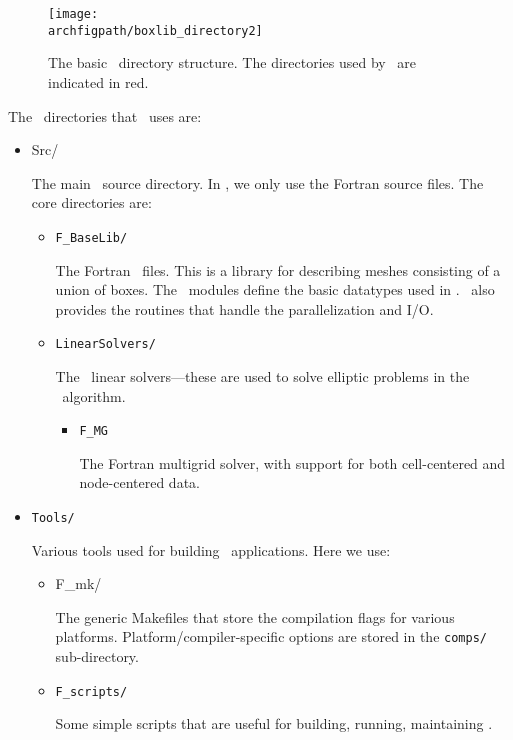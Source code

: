 \begin{figure}[t]
\centering
\texttt{[image: \\archfigpath/boxlib\_directory2]}
\caption[\boxlib\ directory structure]
{The basic \boxlib\ directory structure.  The directories used
by \maestro\ are indicated in red.}
\end{figure}

The \boxlib\ directories that \maestro\ uses are:
\begin{itemize}
\item {Src/}

  The main \boxlib\ source directory.  In \maestro, we only use the
  Fortran source files.  The core directories are:

  \begin{itemize}

  \item {\tt F\_BaseLib/} 

    The Fortran \boxlib\ files.  This is a library for describing
    meshes consisting of a union of boxes.  The \boxlib\ modules
    define the basic datatypes used in \maestro.  \boxlib\ also
    provides the routines that handle the parallelization and I/O.

  \item {\tt LinearSolvers/}

    The \boxlib\ linear solvers---these are used to solve elliptic
    problems in the \maestro\ algorithm.

    \begin{itemize}

    \item {\tt F\_MG}

      The Fortran multigrid solver, with support for both
      cell-centered and node-centered data.

    \end{itemize}

  \end{itemize}

\item {\tt Tools/}

  Various tools used for building \boxlib\ applications.  Here we use:

  \begin{itemize}

  \item {F\_mk/}

    The generic Makefiles that store the compilation flags for various
    platforms.  Platform/compiler-specific options are stored in the
    {\tt comps/} sub-directory.

  \item {\tt F\_scripts/}

    Some simple scripts that are useful for building, running,
    maintaining \maestro.

  \end{itemize}

\end{itemize}






